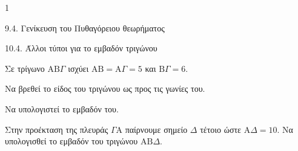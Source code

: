 \begin{ylh}{1}
    \item 9.4. Γενίκευση του Πυθαγόρειου θεωρήματος
    \item 10.4. Άλλοι τύποι για το εμβαδόν τριγώνου
\end{ylh}
Σε τρίγωνο $\mathrm{AB}\Gamma$ ισχύει $\mathrm{AB} = \mathrm{A}\Gamma = 5$ και $\mathrm{B}\Gamma = 6$.
\begin{alist}
\item Να βρεθεί το είδος του τριγώνου ως προς τις γωνίες του. 
\item Να υπολογιστεί το εμβαδόν του. 
\item Στην προέκταση της πλευράς $\Gamma\mathrm{A}$ παίρνουμε σημείο $\Delta$ τέτοιο ώστε $\mathrm{A}\Delta = 10$.
Να υπολογισθεί το εμβαδόν του τριγώνου $\mathrm{AB}\Delta$. 
\end{alist}